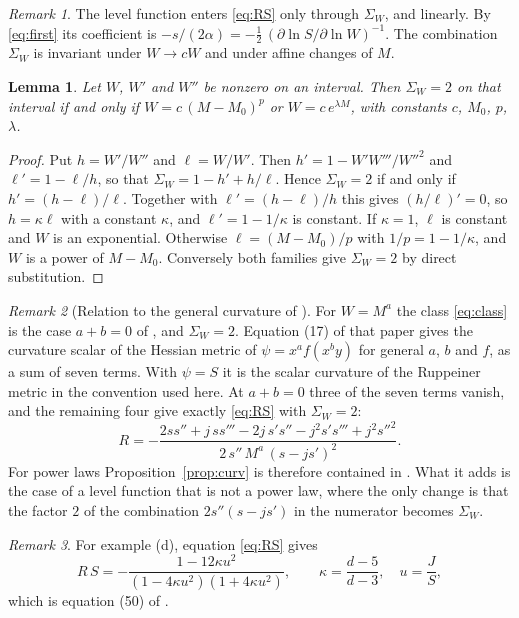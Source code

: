 \documentclass[11pt]{article}
\newtheorem{lemma}{Lemma}
\theoremstyle{definition}
\theoremstyle{remark}
\newtheorem{remark}{Remark}
\newcommand{\SW}{\Sigma_{W}}
\begin{document}
\begin{remark}\label{rem:linear}
The level function enters \eqref{eq:RS} only through $\SW$, and linearly. By \eqref{eq:first} its coefficient is $-s/(2\alpha)=-\tfrac12\,(\partial\ln S/\partial\ln W)^{-1}$. The combination $\SW$ is invariant under $W\to cW$ and under affine changes of $M$.
\end{remark}

\begin{lemma}\label{lem:sigma}
Let $W$, $W'$ and $W''$ be nonzero on an interval. Then $\SW=2$ on that interval if and only if $W=c\,(M-M_{0})^{p}$ or $W=c\,e^{\lambda M}$, with constants $c$, $M_{0}$, $p$, $\lambda$.
\end{lemma}

\begin{proof}
Put $h=W'/W''$ and $\ell=W/W'$. Then $h'=1-W'W'''/W''^{2}$ and $\ell'=1-\ell/h$, so that $\SW=1-h'+h/\ell$. Hence $\SW=2$ if and only if $h'=(h-\ell)/\ell$. Together with $\ell'=(h-\ell)/h$ this gives $(h/\ell)'=0$, so $h=\kappa\ell$ with a constant $\kappa$, and $\ell'=1-1/\kappa$ is constant. If $\kappa=1$, $\ell$ is constant and $W$ is an exponential. Otherwise $\ell=(M-M_{0})/p$ with $1/p=1-1/\kappa$, and $W$ is a power of $M-M_{0}$. Conversely both families give $\SW=2$ by direct substitution.
\end{proof}

\begin{remark}[Relation to the general curvature of \cite{ABP06}]\label{rem:abp}
For $W=M^{a}$ the class \eqref{eq:class} is the case $a+b=0$ of \cite{ABP06}, and $\SW=2$. Equation (17) of that paper gives the curvature scalar of the Hessian metric of $\psi=x^{a}f(x^{b}y)$ for general $a$, $b$ and $f$, as a sum of seven terms. With $\psi=S$ it is the scalar curvature of the Ruppeiner metric in the convention used here. At $a+b=0$ three of the seven terms vanish, and the remaining four give exactly \eqref{eq:RS} with $\SW=2$:
\[
R=-\frac{2ss''+j\,ss'''-2j\,s's''-j^{2}s's'''+j^{2}s''^{2}}{2\,s''\,M^{a}\,(s-js')^{2}} .
\]
For power laws Proposition~\ref{prop:curv} is therefore contained in \cite{ABP06}. What it adds is the case of a level function that is not a power law, where the only change is that the factor $2$ of the combination $2s''(s-js')$ in the numerator becomes $\SW$.
\end{remark}

\begin{remark}\label{rem:ap50}
For example (d), equation \eqref{eq:RS} gives
\[
R\,S=-\frac{1-12\kappa u^{2}}{(1-4\kappa u^{2})(1+4\kappa u^{2})},\qquad \kappa=\frac{d-5}{d-3},\quad u=\frac JS ,
\]
which is equation (50) of \cite{AP06}.
\end{remark}
\end{document}
